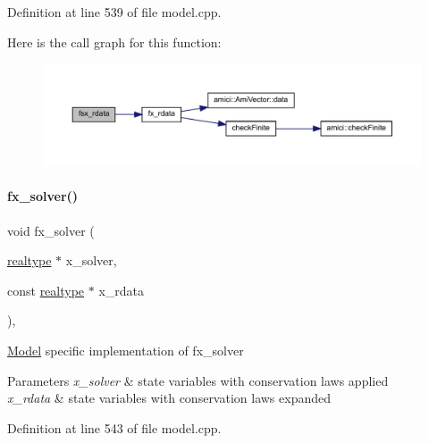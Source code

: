 Definition at line 539 of file model.\+cpp.

Here is the call graph for this function\+:
\nopagebreak
\begin{figure}[H]
\begin{center}
\leavevmode
\includegraphics[width=350pt]{classamici_1_1_model_a6e270d5522af5b494db82a52e5b40e24_cgraph}
\end{center}
\end{figure}
\mbox{\label{classamici_1_1_model_ac08ad3aa4016a5a3ff89d601e15971cc}} 
\paragraph{\texorpdfstring{fx\_solver()}{fx\_solver()}}
{\footnotesize\ttfamily void fx\+\_\+solver (\begin{DoxyParamCaption}\item[{\mbox{\hyperlink{namespaceamici_a1bdce28051d6a53868f7ccbf5f2c14a3}{realtype}} $\ast$}]{x\+\_\+solver,  }\item[{const \mbox{\hyperlink{namespaceamici_a1bdce28051d6a53868f7ccbf5f2c14a3}{realtype}} $\ast$}]{x\+\_\+rdata }\end{DoxyParamCaption})\hspace{0.3cm}{\ttfamily [protected]}, {\ttfamily [virtual]}}

\mbox{\hyperlink{classamici_1_1_model}{Model}} specific implementation of fx\+\_\+solver 
\begin{DoxyParams}{Parameters}
{\em x\+\_\+solver} & state variables with conservation laws applied \\
\hline
{\em x\+\_\+rdata} & state variables with conservation laws expanded \\
\hline
\end{DoxyParams}


Definition at line 543 of file model.\+cpp.

